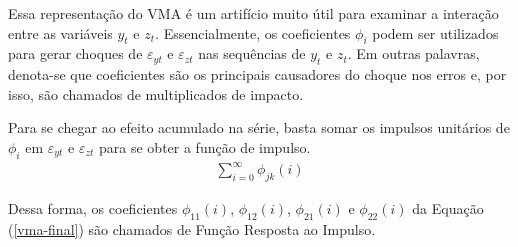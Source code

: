 Essa representação do VMA é um artifício muito útil para examinar a interação entre as variáveis {$y_t$} e {$z_t$}. Essencialmente, os coeficientes $\phi_i$ podem ser utilizados para gerar choques de $\varepsilon_{yt}$ e $\varepsilon_{zt}$ nas sequências de {$y_t$} e {$z_t$}. Em outras palavras, denota-se que coeficientes são os principais causadores do choque nos erros e, por isso, são chamados de multiplicados de impacto.

Para se chegar ao efeito acumulado na série, basta somar os impulsos unitários de $\phi_i$ em $\varepsilon_{yt}$ e $\varepsilon_{zt}$ para se obter a função de impulso.
\begin{align}
    \sum_{i=0}^{\infty} \phi_{jk}(i)
\end{align}

Dessa forma, os coeficientes $\phi_{11}(i)$, $\phi_{12}(i)$, $\phi_{21}(i)$ e $\phi_{22}(i)$ da Equação (\ref{vma-final}) são chamados de Função Resposta ao Impulso.
